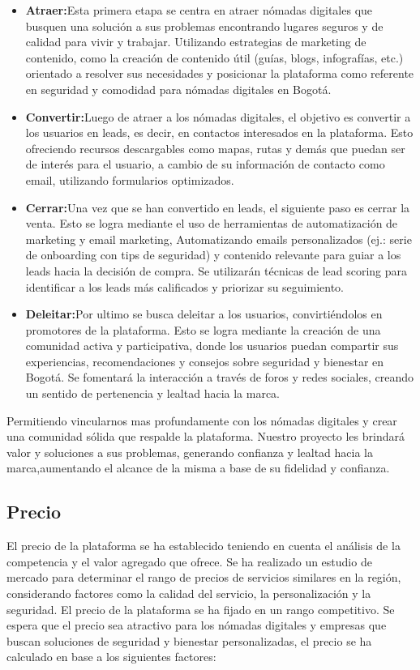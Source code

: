 \begin{itemize}
    \item \textbf{Atraer:}Esta primera etapa se centra en atraer nómadas digitales que busquen una solución a sus problemas encontrando lugares seguros y de calidad para vivir y trabajar. Utilizando estrategias de marketing de contenido, como la creación de contenido útil (guías, blogs, infografías, etc.) orientado a resolver sus necesidades y posicionar la plataforma como referente en seguridad y comodidad para nómadas digitales en Bogotá.
    \item \textbf{Convertir:}Luego de atraer a los nómadas digitales, el objetivo es convertir a los usuarios en leads, es decir, en contactos interesados en la plataforma. Esto ofreciendo recursos descargables como mapas, rutas y demás que puedan ser de interés para el usuario, a cambio de su información de contacto como email, utilizando formularios optimizados.
    \item \textbf{Cerrar:}Una vez que se han convertido en leads, el siguiente paso es cerrar la venta. Esto se logra mediante el uso de herramientas de automatización de marketing y email marketing, Automatizando emails personalizados (ej.: serie de onboarding con tips de seguridad) y contenido relevante para guiar a los leads hacia la decisión de compra. Se utilizarán técnicas de lead scoring para identificar a los leads más calificados y priorizar su seguimiento.
    \item \textbf{Deleitar:}Por ultimo se busca deleitar a los usuarios, convirtiéndolos en promotores de la plataforma. Esto se logra mediante la creación de una comunidad activa y participativa, donde los usuarios puedan compartir sus experiencias, recomendaciones y consejos sobre seguridad y bienestar en Bogotá. Se fomentará la interacción a través de foros y redes sociales, creando un sentido de pertenencia y lealtad hacia la marca.
\end{itemize}

Permitiendo vincularnos mas profundamente con los nómadas digitales y crear una comunidad sólida que respalde la plataforma. Nuestro proyecto les brindará valor y soluciones a sus problemas, generando confianza y lealtad hacia la marca,aumentando el alcance de la misma a base de su fidelidad y confianza.

\subsection*{Precio}
El precio de la plataforma se ha establecido teniendo en cuenta el análisis de la competencia y el valor agregado que ofrece. Se ha realizado un estudio de mercado para determinar el rango de precios de servicios similares en la región, considerando factores como la calidad del servicio, la personalización y la seguridad.
El precio de la plataforma se ha fijado en un rango competitivo. Se espera que el precio sea atractivo para los nómadas digitales y empresas que buscan soluciones de seguridad y bienestar personalizadas, el precio se ha calculado en base a los siguientes factores:

